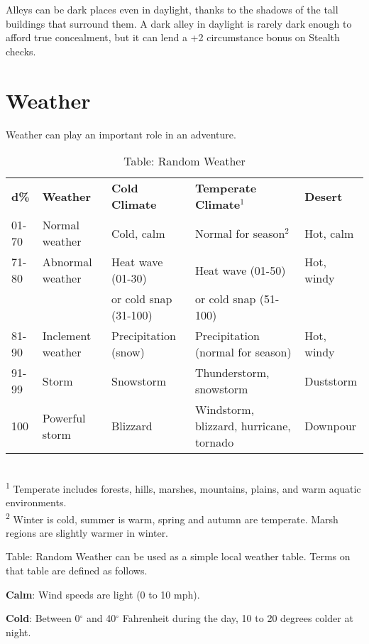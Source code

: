 Alleys can be dark places even in daylight, thanks to the shadows of the tall buildings that surround them. A dark alley in daylight is rarely dark enough to afford true concealment, but it can lend a +2 circumstance bonus on Stealth checks.
				
\section{Weather}

				
Weather can play an important role in an adventure.
				
\begin{table*}[]
\sffamily
\caption{Table: Random Weather}
\begin{tabular}{lllll}
\textbf{d\%} & \textbf{Weather} & \textbf{Cold Climate} & \textbf{Temperate Climate\(^{1}\)} & \textbf{Desert}\\
01-70 & Normal weather & Cold, calm & Normal for season\(^{2}\) & Hot, calm\\
71-80 & Abnormal weather & Heat wave (01-30) & Heat wave (01-50)  & Hot, windy\\
      &                  & or cold snap (31-100) & or cold snap (51-100) & \\
81-90 & Inclement weather & Precipitation (snow) & Precipitation (normal for season) & Hot, windy\\
91-99 & Storm & Snowstorm & Thunderstorm, snowstorm & Duststorm\\
100 & Powerful storm & Blizzard & Windstorm, blizzard, hurricane, tornado & Downpour\\
\end{tabular}\\
\textsuperscript{1} Temperate includes forests, hills, marshes, mountains, plains, and warm aquatic environments.\\
\textsuperscript{2} Winter is cold, summer is warm, spring and autumn are temperate. Marsh regions are slightly warmer in winter.\\
\end{table*}
				
Table: Random Weather can be used as a simple local weather table. Terms on that table are defined as follows.
				
\textbf{Calm}: Wind speeds are light (0 to 10 mph).
				
\textbf{Cold}: Between 0\mbox{${}^\circ$} and 40\mbox{${}^\circ$} Fahrenheit during the day, 10 to 20 degrees colder at night.
				
